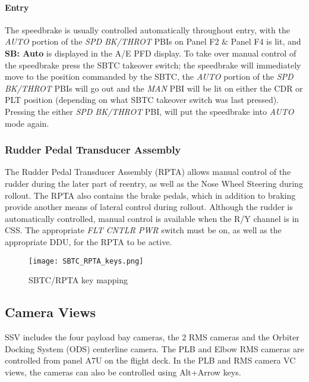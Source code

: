 \documentclass[Space_Shuttle_Vessel_Manual.tex]{subfiles}
\begin{document}
\begin{multicols*}{2}
\paragraph{Entry}
\label{sec:entry}
The speedbrake is usually controlled automatically throughout entry, with the \textit{AUTO} portion of the \textit{SPD BK/THROT} PBIs on Panel F2 \& Panel F4 is lit, and \textbf{SB: Auto} is displayed in the A/E PFD display. To take over manual control of the speedbrake press the SBTC takeover switch; the speedbrake will immediately move to the position commanded by the SBTC, the \textit{AUTO} portion of the \textit{SPD BK/THROT} PBIs will go out and the \textit{MAN} PBI will be lit on either the CDR or PLT position (depending on what SBTC takeover switch was last pressed). Pressing the either \textit{SPD BK/THROT} PBI, will put the speedbrake into \textit{AUTO} mode again.

\subsubsection{Rudder Pedal Transducer Assembly}
The Rudder Pedal Transducer Assembly (RPTA) allows manual control of the rudder during the later part of reentry, as well as the Nose Wheel Steering during rollout. The RPTA also contains the brake pedals, which in addition to braking provide another means of lateral control during rollout. Although the rudder is automatically controlled, manual control is available when the R/Y channel is in CSS. The appropriate \textit{FLT CNTLR PWR} switch must be on, as well as the appropriate DDU, for the RPTA to be active.




\begin{figure}[H]
  \texttt{[image: SBTC\_RPTA\_keys.png]}
  \caption{SBTC/RPTA key mapping}
  \label{fig:SBTC_RPTA_keys}
\end{figure}


\subsection{Camera Views}
SSV includes the four payload bay cameras, the 2 RMS cameras and the Orbiter Docking System (ODS) centerline camera. The PLB and Elbow RMS cameras are controlled from panel A7U on the flight deck. In the PLB and RMS camera VC views, the cameras can also be controlled using Alt+Arrow keys.


\end{multicols*}
\end{document}
